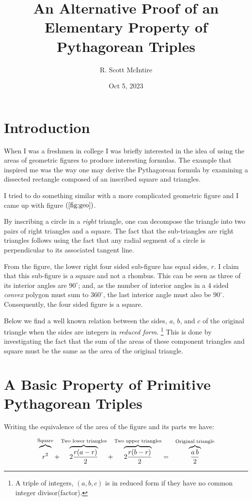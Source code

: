 \documentclass[12pt]{article}
\title{An Alternative Proof of an Elementary Property of Pythagorean Triples}
\author{R. Scott McIntire}
\date{Oct 5, 2023}
\begin{document}
\maketitle

\section{Introduction}
When I was a freshmen in college I was briefly interested in the idea of 
using the areas of geometric figures to
produce interesting formulas. The example that inspired me was the way one 
may derive the Pythagorean formula
by examining a dissected rectangle composed of 
an inscribed square and triangles. 

I tried to do something similar with a more complicated geometric figure and 
I came up with figure $(\ref{fig:geo})$.

By inscribing a circle in a {\em right\/} triangle, one can decompose the triangle 
into two pairs of right triangles and a square. The fact that the sub-triangles
are right triangles follows using the fact that 
any radial segment of a circle is perpendicular to its
associated tangent line. 

From the figure, the lower right four sided sub-figure has equal sides, $r$.
I claim that this sub-figure is a square and not a rhombus.
This can be seen as three of its interior angles are 
$90^\circ$; and, as the number of interior angles in a 4 sided {\em convex\/} 
polygon must sum to $360^\circ$, the last interior angle must also be $90^\circ$.
Consequently, the four sided figure is a square.

Below we find a well known relation between the sides, $a$, $b$, and $c$ of the
original triangle when the sides are integers in {\em reduced form\/}.%
\footnote{A triple of integers, $(a, b, c)$ is in reduced form if 
they have no common integer divisor(factor).}
This is done by investigating the fact that the sum of the areas
of these component triangles 
and square must be the same as the area of the original triangle. 

\section{A Basic Property of Primitive Pythagorean Triples}
Writing the equivalence of the area of the figure and its parts we have:

\begin{eqnarray}
    \overbrace{\vphantom{\frac{X^1}{X}}r^2}^{\text{Square}} 
    + \overbrace{2 \frac{r(a - r)}{2}}^{\text{Two lower triangles}} 
    + \overbrace{2 \frac{r(b-r)}{2}}^{\text{Two upper triangles}}  
    &=& \overbrace{\frac{a\, b}{2}}^{\text{Original triangle}}  
\end{eqnarray}
\end{document}
